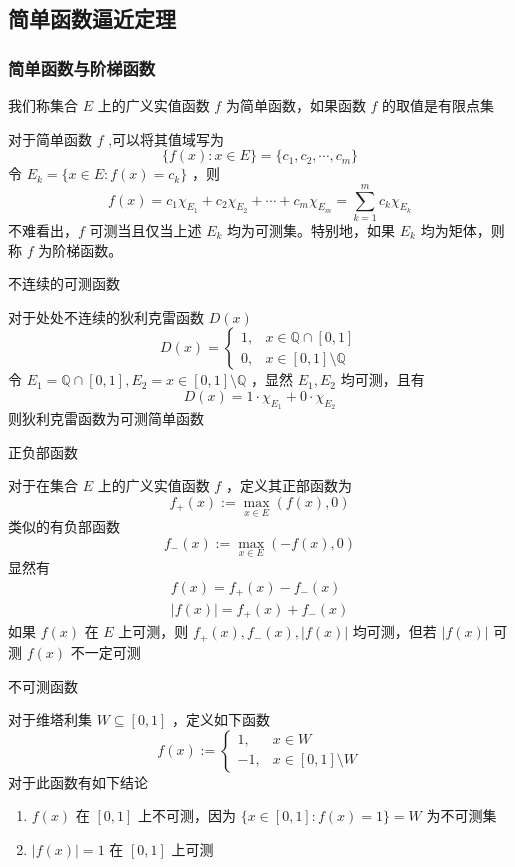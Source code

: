 \documentclass{ctexbook}
\newcommand{\no}{\noindent}
\newcommand{\EXP}{\no {\bf 例}\quad}
\newcommand{\ITEMS}{\begin{enumerate}[leftmargin=4em]}
\newcommand{\ITEME}{\end{enumerate}}
\begin{document}
\subsection{简单函数逼近定理}

\subsubsection{简单函数与阶梯函数}

我们称集合 $E$ 上的广义实值函数 $f$ 为简单函数，如果函数 $f$ 的取值是有限点集

对于简单函数 $f$ ,可以将其值域写为
\[
\{f(x):x\in E\} = \{c_1, c_2, \cdots, c_m\}
\]
令 $E_k = \{x\in E : f(x) = c_k\}$ ，则
\[
f(x) = c_1 \chi_{E_1} + c_2 \chi_{E_2} + \cdots + c_m \chi_{E_m} = \sum_{k=1}^m c_k \chi_{E_k}
\]
不难看出，$f$ 可测当且仅当上述 $E_k$ 均为可测集。特别地，如果 $E_k$ 均为矩体，则称 $f$ 为阶梯函数。
\bigskip 

\EXP 不连续的可测函数

对于处处不连续的狄利克雷函数 $D(x)$
\[
D(x) = \begin{cases}
	1, & x\in\mathbb{Q} \cap [0,1]\\
	0, & x\in[0,1] \setminus \mathbb{Q}
\end{cases}
\]
令 $E_1 = \mathbb{Q} \cap [0,1], E_2 = x\in[0,1] \setminus \mathbb{Q}$ ，显然 $E_1,E_2$ 均可测，且有
\[
D(x) = 1\cdot \chi_{E_1} + 0\cdot \chi_{E_2}
\]
则狄利克雷函数为可测简单函数
\bigskip

\EXP 正负部函数

对于在集合 $E$ 上的广义实值函数 $f$ ，定义其正部函数为
\[
f_+(x) := \max_{x \in E} (f(x),0)
\]
类似的有负部函数
\[
f_-(x) := \max_{x \in E} (-f(x),0)
\]
显然有
\[
\begin{aligned}
	f(x) = f_+(x) - f_-(x)\\
	\lvert f(x)\rvert = f_+(x) + f_-(x)
\end{aligned}
\]
如果 $f(x)$ 在 $E$ 上可测，则 $f_+(x),f_-(x),\lvert f(x)\rvert$ 均可测，但若 $\lvert f(x)\rvert$ 可测 $f(x)$ 不一定可测
\bigskip

\EXP 不可测函数

对于维塔利集 $W \subseteq [0,1]$ ，定义如下函数
\[
f(x) := \begin{cases}
	1, &x\in W\\
	-1, &x\in[0,1]\setminus W
\end{cases}
\]
对于此函数有如下结论
\ITEMS
\item $f(x)$ 在 $[0,1]$ 上不可测，因为 $\{x\in[0,1]: f(x) = 1\} = W$ 为不可测集
\item $\lvert f(x) \rvert = 1$ 在 $[0,1]$ 上可测
\ITEME 
\end{document}
